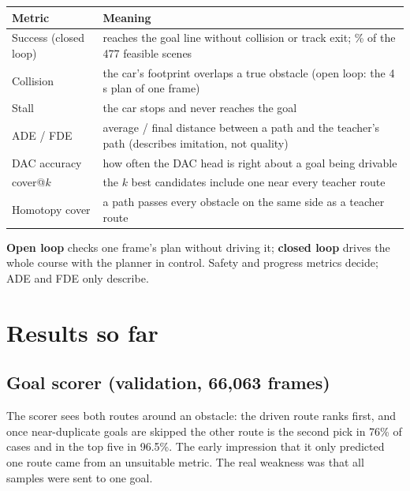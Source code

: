 \documentclass[11pt,a4paper]{article}
\begin{document}
\begin{table}[h]
\small
\begin{tabularx}{\linewidth}{@{}lL@{}}
\toprule
Metric & Meaning \\
\midrule
Success (closed loop) & reaches the goal line without collision or track exit; \% of the 477 feasible scenes \\
Collision & the car's footprint overlaps a true obstacle (open loop: the 4\,s plan of one frame) \\
Stall & the car stops and never reaches the goal \\
ADE / FDE & average / final distance between a path and the teacher's path (describes imitation, not quality) \\
DAC accuracy & how often the DAC head is right about a goal being drivable \\
cover@$k$ & the $k$ best candidates include one near every teacher route \\
Homotopy cover & a path passes every obstacle on the same side as a teacher route \\
\bottomrule
\end{tabularx}
\end{table}

\textbf{Open loop} checks one frame's plan without driving it; \textbf{closed loop} drives the whole
course with the planner in control. Safety and progress metrics decide; ADE and FDE only describe.

\section{Results so far}
\label{sec:results}

\subsection{Goal scorer (validation, 66{,}063 frames)}
The scorer sees both routes around an obstacle: the driven route ranks first, and once near-duplicate goals
are skipped the other route is the second pick in 76\% of cases and in the top five in 96.5\%. The early
impression that it only predicted one route came from an unsuitable metric. The real weakness was that all
samples were sent to one goal.
\end{document}
